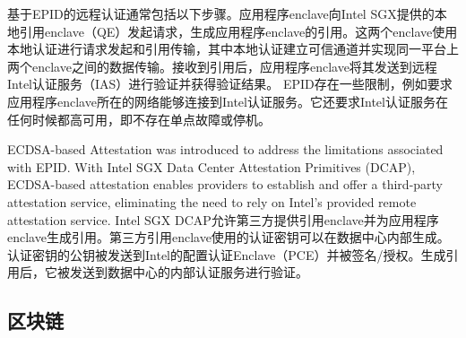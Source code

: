 基于EPID的远程认证通常包括以下步骤。应用程序enclave向Intel SGX提供的本地引用enclave（QE）发起请求，生成应用程序enclave的引用。这两个enclave使用本地认证进行请求发起和引用传输，其中本地认证建立可信通道并实现同一平台上两个enclave之间的数据传输。接收到引用后，应用程序enclave将其发送到远程Intel认证服务（IAS）进行验证并获得验证结果。
EPID存在一些限制，例如要求应用程序enclave所在的网络能够连接到Intel认证服务。它还要求Intel认证服务在任何时候都高可用，即不存在单点故障或停机。

ECDSA-based Attestation was introduced to address the limitations associated with EPID. With Intel SGX Data Center Attestation Primitives (DCAP), ECDSA-based attestation enables providers to establish and offer a third-party attestation service, eliminating the need to rely on Intel's provided remote attestation service.
Intel SGX DCAP允许第三方提供引用enclave并为应用程序enclave生成引用。第三方引用enclave使用的认证密钥可以在数据中心内部生成。认证密钥的公钥被发送到Intel的配置认证Enclave（PCE）并被签名/授权。生成引用后，它被发送到数据中心的内部认证服务进行验证。


\subsection{区块链}
